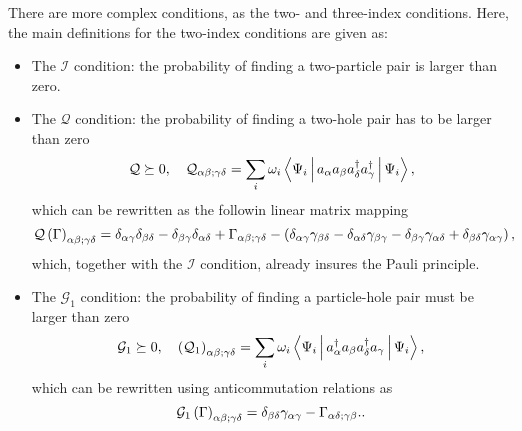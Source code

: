 There are more complex conditions, as the two- and three-index conditions.
Here, the main definitions for the two-index conditions are given as:
\begin{itemize}
    \item The $\mathcal{I}$ condition: the probability of finding a 
        two-particle pair is larger than zero.

    \item The $\mathcal{Q}$ condition: the probability of finding a two-hole
        pair has to be larger than zero 
        \begin{equation}
            \mathcal{Q} \succeq 0, \quad
            \mathcal{Q}_{\alpha \beta;\gamma \delta} =
            \sum_{i} \omega_i 
            \Braket{\Psi_i | a_{\alpha} a_{\beta} 
            a_{\delta}^{\dagger} a_{\gamma}^{\dagger} | \Psi_i},
        \end{equation}
        which can be rewritten as the followin linear matrix mapping 
        \begin{equation}
            \mathcal{Q}\left( \Gamma \right)_{\alpha\beta;\gamma\delta} =
            \delta_{\alpha\gamma}\delta_{\beta\delta} - 
            \delta_{\beta\gamma}\delta_{\alpha\delta} + 
            \Gamma_{\alpha\beta;\gamma\delta} - 
            \left(
                \delta_{\alpha\gamma}\gamma_{\beta\delta} - 
                \delta_{\alpha\delta}\gamma_{\beta\gamma} - 
                \delta_{\beta\gamma}\gamma_{\alpha\delta} + 
                \delta_{\beta\delta}\gamma_{\alpha\gamma}
            \right)
            ,
        \end{equation}
        which, together with the $\mathcal{I}$ condition, already insures the 
        Pauli principle.

    \item The $\mathcal{G}_1$ condition: the probability of finding a 
        particle-hole pair must be larger than zero
        \begin{equation}
            \mathcal{G}_1 \succeq 0, \quad
            \left( \mathcal{Q}_1 \right)_{\alpha \beta;\gamma \delta} =
            \sum_{i} \omega_i 
            \Braket{\Psi_i | a_{\alpha}^{\dagger} a_{\beta} 
            a_{\delta}^{\dagger} a_{\gamma} | \Psi_i},
        \end{equation}
        which can be rewritten using anticommutation relations as
        \begin{equation}
            \mathcal{G}_1\left( \Gamma \right)_{\alpha\beta;\gamma\delta} =
            \delta_{\beta \delta} \gamma_{\alpha \gamma} - \Gamma_{\alpha \delta ; \gamma \beta}.
            .
        \end{equation}


\end{itemize}
